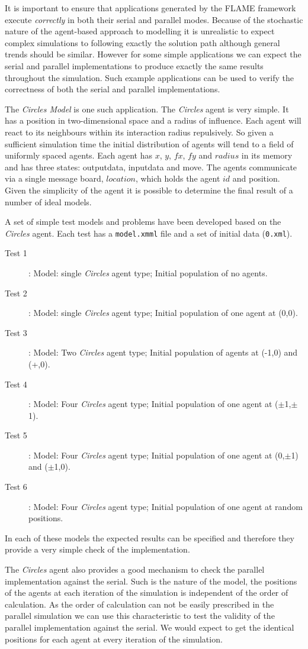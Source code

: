 
It is important to ensure that applications generated by the FLAME framework execute \textsl{correctly} in both their serial and parallel modes. Because of the stochastic nature of the agent-based approach to modelling it is unrealistic to expect complex simulations to following exactly the solution path although general trends should be similar. However for some simple applications we can expect the serial and parallel implementations to produce exactly the same results throughout the simulation. Such example applications can be used to verify the correctness of both the serial and parallel implementations.

The \textsl{Circles Model} is one such application. The \textsl{Circles} agent is very simple. It has a position in two-dimensional space and a radius of influence. Each agent will react to its neighbours within its interaction radius repulsively. So given a sufficient simulation time the initial distribution of agents will tend to a field of uniformly spaced agents. Each agent has $x$, $y$, $fx$, $fy$ and $radius$ in its memory and has three states: outputdata, inputdata and move. The agents communicate via a single message board, $location$, which holds the agent $id$ and position. Given the simplicity of the agent it is possible to determine the final result of a number of ideal models.

A set of simple test models and problems have been developed based on the \textsl{Circles} agent. Each test has a \texttt{model.xmml} file and a set of initial data (\texttt{0.xml}).
\begin{description}
 \item [Test 1]: Model: single \textsl{Circles} agent type; Initial population of no agents.
 \item [Test 2]: Model: single \textsl{Circles} agent type; Initial population of one agent at (0,0).
	\item [Test 3]: Model: Two \textsl{Circles} agent type; Initial population of agents at (-1,0) and (+,0).
	\item [Test 4]: Model: Four \textsl{Circles} agent type; Initial population of one agent at ($\pm$1,$\pm$1).
	\item [Test 5]: Model: Four \textsl{Circles} agent type; Initial population of one agent at (0,$\pm$1) and ($\pm$1,0).
	\item [Test 6]: Model: Four \textsl{Circles} agent type; Initial population of one agent at random positions.
	\end{description}
In each of these models the expected results can be specified and therefore they provide a very simple check of the implementation.

The \textsl{Circles} agent also provides a good mechanism to check the parallel implementation against the serial. Such is the nature of the model, the positions of the agents at each iteration of the simulation is independent of the order of calculation. As the order of calculation can not be easily prescribed in the parallel simulation we can use this characteristic to test the validity of the parallel implementation against the serial. We would expect to get the identical positions for each agent at every iteration of the simulation.

